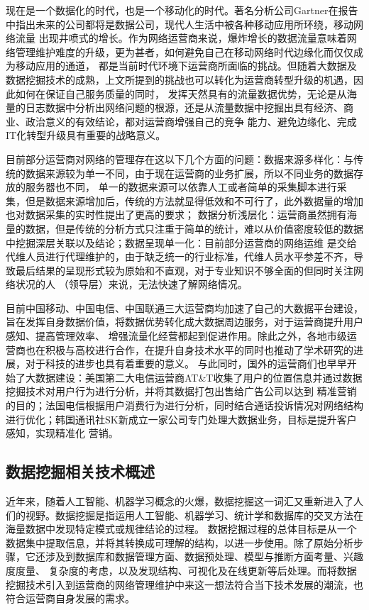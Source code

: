 \documentclass{HustGraduPaper}
\begin{document}
    现在是一个数据化的时代，也是一个移动化的时代。著名分析公司Gartner在报告中指出未来的公司都将是数据公司，现代人生活中被各种移动应用所环绕，移动网络流量
    出现井喷式的增长。作为网络运营商来说，爆炸增长的数据流量意味着网络管理维护难度的升级，更为甚者，如何避免自己在移动网络时代边缘化而仅仅成为移动应用的通道，
    都是当前时代环境下运营商所面临的挑战。但随着大数据及数据挖掘技术的成熟，上文所提到的挑战也可以转化为运营商转型升级的机遇，因此如何在保证自己服务质量的同时，
    发挥天然具有的流量数据优势，无论是从海量的日志数据中分析出网络问题的根源，还是从流量数据中挖掘出具有经济、商业、政治意义的有效结论，都对运营商增强自己的竞争
    能力、避免边缘化、完成IT化转型升级具有重要的战略意义。

    目前部分运营商对网络的管理存在这以下几个方面的问题：数据来源多样化：与传统的数据来源较为单一不同，由于现在运营商的业务扩展，所以不同业务的数据存放的服务器也不同，
    单一的数据来源可以依靠人工或者简单的采集脚本进行采集，但是数据来源增加后，传统的方法就显得低效和不可行了，此外数据量的增加也对数据采集的实时性提出了更高的要求；
    数据分析浅层化：运营商虽然拥有海量的数据，但是传统的分析方式只注重于简单的统计，难以从价值密度较低的数据中挖掘深层关联以及结论；数据呈现单一化：目前部分运营商的网络运维
    是交给代维人员进行代理维护的，由于缺乏统一的行业标准，代维人员水平参差不齐，导致最后结果的呈现形式较为原始和不直观，对于专业知识不够全面的但同时关注网络状况的人
    （领导层）来说，无法快速了解网络情况。

    目前中国移动、中国电信、中国联通三大运营商均加速了自己的大数据平台建设，旨在发挥自身数据价值，将数据优势转化成大数据周边服务，对于运营商提升用户感知、提高管理效率、
    增强流量化经营都起到促进作用。除此之外，各地市级运营商也在积极与高校进行合作，在提升自身技术水平的同时也推动了学术研究的进展，对于科技的进步也具有着重要的意义。
    与此同时，国外的运营商们也早早开始了大数据建设：美国第二大电信运营商AT\&T收集了用户的位置信息并通过数据挖掘技术对用户行为进行分析，并将其数据打包出售给广告公司以达到
    精准营销的目的；法国电信根据用户消费行为进行分析，同时结合通话投诉情况对网络结构进行优化；韩国通讯社SK新成立一家公司专门处理大数据业务，目标是提升客户感知，实现精准化
    营销。

    \subsection{数据挖掘相关技术概述}
    近年来，随着人工智能、机器学习概念的火爆，数据挖掘这一词汇又重新进入了人们的视野。数据挖掘是指运用人工智能、机器学习、统计学和数据库的交叉方法在海量数据中发现特定模式或规律结论的过程。
    数据挖掘过程的总体目标是从一个数据集中提取信息，并将其转换成可理解的结构，以进一步使用。除了原始分析步骤，它还涉及到数据库和数据管理方面、数据预处理、模型与推断方面考量、兴趣度度量、
    复杂度的考虑，以及发现结构、可视化及在线更新等后处理。而将数据挖掘技术引入到运营商的网络管理维护中来这一想法符合当下技术发展的潮流，也符合运营商自身发展的需求。
    
\end{document}
